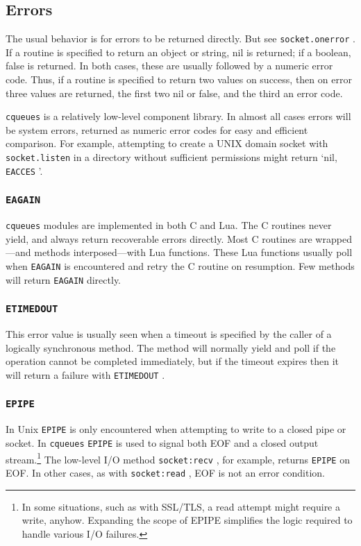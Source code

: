 \documentclass[11pt, oneside]{memoir}
\newcommand{\cqueues}[0]{\texttt{cqueues} }
\newcommand{\routine}[1]{\texttt{#1} }
\newcommand{\method}[1]{\texttt{#1} }
\newcommand{\errno}[1]{\texttt{#1} }
\begin{document}
\subsection{Errors}

The usual behavior is for errors to be returned directly. But see \routine{socket.onerror}. If a routine is specified to return an object or string, nil is returned; if a boolean, false is returned. In both cases, these  are usually followed by a numeric error code. Thus, if a routine is specified to return two values on success, then on error three values are returned, the first two nil or false, and the third an error code.

\cqueues is a relatively low-level component library. In almost all cases errors will be system errors, returned as numeric error codes for easy and efficient comparison. For example, attempting to create a UNIX domain socket with \routine{socket.listen} in a directory without sufficient permissions might return `nil, \errno{EACCES}'.

\subsubsection{\texttt{EAGAIN}}

\cqueues modules are implemented in both C and Lua. The C routines never yield, and always return recoverable errors directly. Most C routines are wrapped---and methods interposed---with Lua functions. These Lua functions usually poll when \errno{EAGAIN} is encountered and retry the C routine on resumption. Few methods will return \errno{EAGAIN} directly.

\subsubsection{\texttt{ETIMEDOUT}}

This error value is usually seen when a timeout is specified by the caller of a logically synchronous method. The method will normally yield and poll if the operation cannot be completed immediately, but if the timeout expires then it will return a failure with \errno{ETIMEDOUT}.

\subsubsection{\texttt{EPIPE}}

In Unix \errno{EPIPE} is only encountered when attempting to write to a closed pipe or socket. In \cqueues \errno{EPIPE} is used to signal both EOF and a closed output stream.\footnote{In some situations, such as with SSL/TLS, a read attempt might require a write, anyhow. Expanding the scope of EPIPE simplifies the logic required to handle various I/O failures.} The low-level I/O method \method{socket:recv}, for example, returns \errno{EPIPE} on EOF. In other cases, as with \method{socket:read}, EOF is not an error condition.
\end{document}
